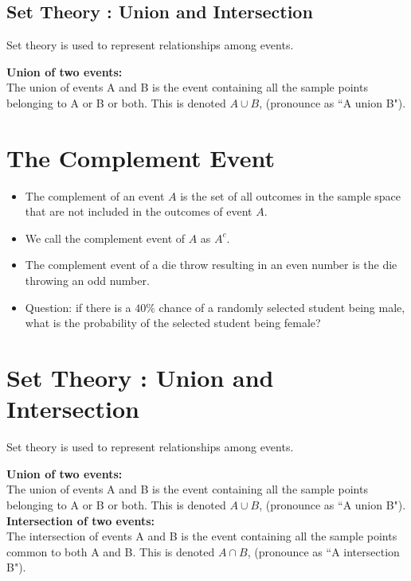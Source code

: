 \documentclass[]{report}
\begin{document}
\subsection{Set Theory : Union and Intersection}

Set theory is used to represent relationships among events.\\ \bigskip

\noindent \textbf{Union of two events:}\\
The union of events A and B is the event containing all the sample points
belonging to A or B or both. This is denoted $A\cup B$, (pronounce as ``A union
B").\\ 



\section{The Complement Event}

\begin{itemize} 

\item The complement of an event $A$ is the set of all outcomes in the sample
space that are not included in the outcomes of event $A$.
\item We call the complement event of $A$ as $A^c$.
\item The complement event of a die throw resulting in an even number is the
die throwing an odd number.
\item Question: if there is a $40\%$ chance of a randomly selected student being male, what is the probability of the selected student being female?
\end{itemize}

\section{Set Theory : Union and Intersection}

Set theory is used to represent relationships among events.\\ \bigskip

\noindent \textbf{Union of two events:}\\
The union of events A and B is the event containing all the sample points
belonging to A or B or both. This is denoted $A\cup B$, (pronounce as ``A union
B").\\ \bigskip
\noindent \textbf{Intersection of two events:}\\
The intersection of events A and B is the event containing all the sample
points common to both A and B. This is denoted $A\cap B$, (pronounce as ``A intersection
B").
\end{document}
